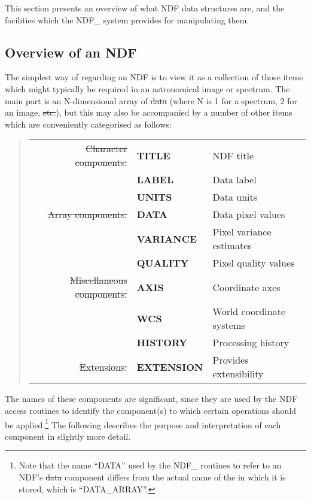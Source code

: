 This section presents an overview of what NDF data structures are, and the
facilities which the NDF\_ system provides for manipulating them. 

\subsection{\label{ss:componentnames}Overview of an NDF}

The simplest way of regarding an NDF is to view it as a collection of those
items which might typically be required in an astronomical image or
spectrum. 
The main part is an N-dimensional array of \st{data\/} (where N is 1 for a
spectrum, 2 for an image, \st{etc.}), but this may also be accompanied by a
number of other items which are conveniently categorised as follows: 

\small
\begin{quote}
\begin{center}
\begin{tabular}{rl@{ --- }l}
    \st{Character components:} & {\bf TITLE} & NDF title\\
                                & {\bf LABEL} & Data label\\
                                & {\bf UNITS} & Data units\\[1ex]
        \st{Array components:} & {\bf DATA}  & Data pixel values\\
                                & {\bf VARIANCE} & Pixel variance estimates\\
                                & {\bf QUALITY} & Pixel quality values\\[1ex]
\st{Miscellaneous components:} & {\bf AXIS} & Coordinate axes\\
                                & {\bf WCS} & World coordinate systems\\
                                & {\bf HISTORY} & Processing history\\[1ex]
              \st{Extensions:} & {\bf EXTENSION} & Provides extensibility
\end{tabular}
\end{center}
\end{quote}
\normalsize

The names of these components are significant, since they are used by the
NDF access routines to identify the component(s) to which certain operations
should be applied.\footnote{Note that the name ``DATA'' used by the
NDF\_ routines to refer to an NDF's \st{data\/} component differs
from the actual name of the  in
which it is stored, which is ``DATA\_ARRAY''.}
The following describes the purpose and interpretation of each component in 
slightly more detail.


